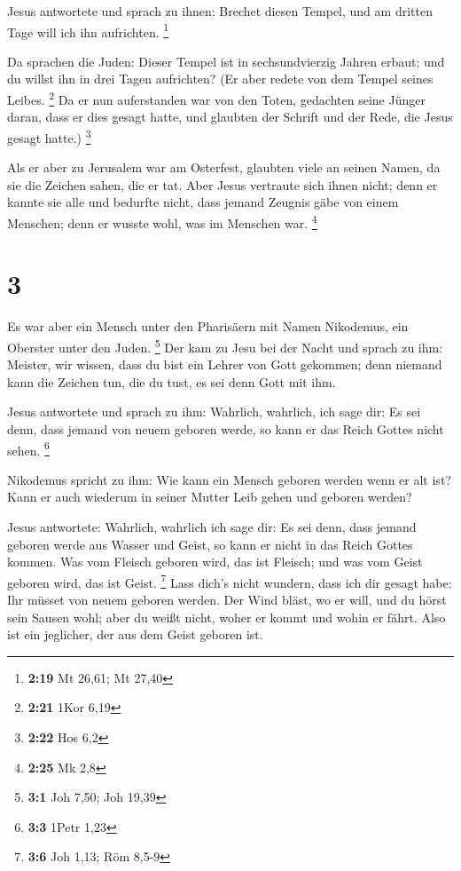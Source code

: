  Jesus antwortete und sprach zu ihnen: Brechet diesen
Tempel, und am dritten Tage will ich ihn aufrichten. \footnote{\textbf{2:19}
  Mt 26,61; Mt 27,40}

 Da sprachen die Juden: Dieser Tempel ist in
sechsundvierzig Jahren erbaut; und du willst ihn in drei Tagen
aufrichten?  (Er aber redete von dem Tempel seines Leibes.
\footnote{\textbf{2:21} 1Kor 6,19}  Da er nun auferstanden
war von den Toten, gedachten seine Jünger daran, dass er dies gesagt
hatte, und glaubten der Schrift und der Rede, die Jesus gesagt hatte.)
\footnote{\textbf{2:22} Hos 6,2}

 Als er aber zu Jerusalem war am Osterfest, glaubten viele
an seinen Namen, da sie die Zeichen sahen, die er tat. 
Aber Jesus vertraute sich ihnen nicht; denn er kannte sie alle
 und bedurfte nicht, dass jemand Zeugnis gäbe von einem
Menschen; denn er wusste wohl, was im Menschen war. \footnote{\textbf{2:25}
  Mk 2,8}

\hypertarget{section-2}{%
\section{3}\label{section-2}}

 Es war aber ein Mensch unter den Pharisäern mit Namen
Nikodemus, ein Oberster unter den Juden. \footnote{\textbf{3:1} Joh
  7,50; Joh 19,39}  Der kam zu Jesu bei der Nacht und sprach
zu ihm: Meister, wir wissen, dass du bist ein Lehrer von Gott gekommen;
denn niemand kann die Zeichen tun, die du tust, es sei denn Gott mit
ihm.

 Jesus antwortete und sprach zu ihm: Wahrlich, wahrlich, ich
sage dir: Es sei denn, dass jemand von neuem geboren werde, so kann er
das Reich Gottes nicht sehen. \footnote{\textbf{3:3} 1Petr 1,23}

 Nikodemus spricht zu ihm: Wie kann ein Mensch geboren
werden wenn er alt ist? Kann er auch wiederum in seiner Mutter Leib
gehen und geboren werden?

 Jesus antwortete: Wahrlich, wahrlich ich sage dir: Es sei
denn, dass jemand geboren werde aus Wasser und Geist, so kann er nicht
in das Reich Gottes kommen.  Was vom Fleisch geboren wird,
das ist Fleisch; und was vom Geist geboren wird, das ist Geist.
\footnote{\textbf{3:6} Joh 1,13; Röm 8,5-9}  Lass dich's
nicht wundern, dass ich dir gesagt habe: Ihr müsset von neuem geboren
werden.  Der Wind bläst, wo er will, und du hörst sein
Sausen wohl; aber du weißt nicht, woher er kommt und wohin er fährt.
Also ist ein jeglicher, der aus dem Geist geboren ist.

